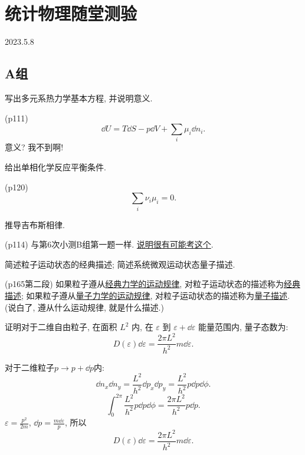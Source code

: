 \section{统计物理随堂测验}
2023.5.8
\subsection{A组}
\begin{questions}
  \question 写出多元系热力学基本方程, 并说明意义.
\begin{solution}
  (p111)
  \begin{equation}
    \dd U = T\dd S - p\dd V + \sum_i \mu_i\dd n_i.
  \end{equation}
  意义? 我不到啊!
\end{solution}
  \question 给出单相化学反应平衡条件.
\begin{solution}
  (p120)
  \begin{equation}
    \sum_i \nu_i\mu_i = 0.
  \end{equation}
\end{solution}
  \question 推导吉布斯相律.
\begin{solution}
  (p114) 与第6次小测B组第一题一样. \uline{说明很有可能考这个}.
\end{solution}
  \question 简述粒子运动状态的经典描述; 简述系统微观运动状态量子描述.
\begin{solution}
  (p165第二段) 如果粒子遵从\uline{经典力学的运动规律}, 对粒子运动状态的描述称为\uline{经典描述}; 如果粒子遵从\uline{量子力学的运动规律}, 对粒子运动状态的描述称为\uline{量子描述}. (说白了, 遵从什么运动规律, 就是什么描述.)
\end{solution}
  \question 证明对于二维自由粒子, 在面积 $L^2$ 内, 在 $\varepsilon$ 到 $\varepsilon+\dd \varepsilon$ 能量范围内, 量子态数为:
  \begin{equation}
    D(\varepsilon)\dd \varepsilon = \frac{2\pi L^2}{h^2}m \dd \varepsilon.
  \end{equation}
\begin{solution}
  对于二维粒子$p\to p+\dd p$内:
  \begin{equation}
    \dd n_x \dd n_y = \frac{L^2}{h^2}\dd p_x \dd p_y = \frac{L^2}{h^2} p\dd p \dd\phi.
  \end{equation}
  \begin{equation}
    \int_0^{2\pi}\frac{L^2}{h^2} p\dd p \dd\phi = \frac{2\pi L^2}{h^2}p\dd p.
  \end{equation}
  $\varepsilon = \frac{p^2}{2m}$, $\dd p = \frac{m\dd \varepsilon}{p}$,
  所以
  \begin{equation}
    D(\varepsilon)\dd \varepsilon = \frac{2\pi L^2}{h^2}m \dd \varepsilon.
  \end{equation}
\end{solution}
\end{questions}

